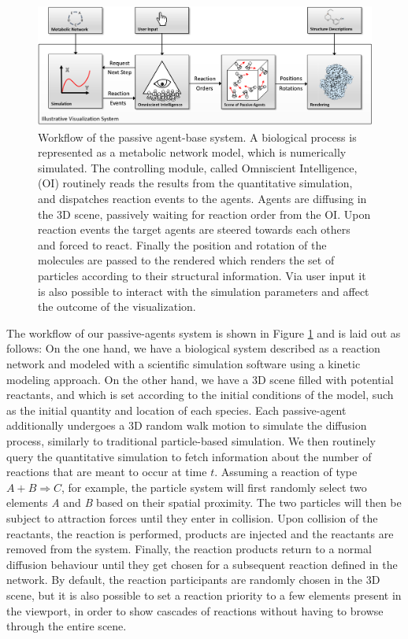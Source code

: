 \begin{figure}
	\centering
	\includegraphics[width=0.8\linewidth]{graphics/figure2_1}
	\caption{Workflow of the passive agent-base system. A biological process is represented as a metabolic network model, which is numerically simulated. The controlling module, called Omniscient Intelligence, (OI) routinely reads the results from the quantitative simulation, and dispatches reaction events to the agents. Agents are diffusing in the 3D scene, passively waiting for reaction order from the OI. Upon reaction events the target agents are steered towards each others and forced to react. Finally the position and rotation of the molecules are passed to the rendered which renders the set of particles according to their structural information. Via user input it is also possible to interact with the simulation parameters and affect the outcome of the visualization.}
	\label{fig:figure21}
\end{figure}

The workflow of our passive-agents system is shown in Figure \ref{fig:figure21} and is laid out as follows:
On the one hand, we have a biological system described as a reaction network and modeled with a scientific simulation software using a kinetic modeling approach.
On the other hand, we have a 3D scene filled with potential reactants, and which is set according to the initial conditions of the model, such as the initial quantity and location of each species.
Each passive-agent additionally undergoes a 3D random walk motion to simulate the diffusion process, similarly to traditional particle-based simulation.
We then routinely query the quantitative simulation to fetch information about the number of reactions that are meant to occur at time $t$.
Assuming a reaction of type $A + B \Rightarrow C$, for example, the particle system will first randomly select two elements \textit{A} and \textit{B} based on their spatial proximity.
The two particles will then be subject to attraction forces until they enter in collision.
Upon collision of the reactants, the reaction is performed, products are injected and the reactants are removed from the system.
Finally, the reaction products return to a normal diffusion behaviour until they get chosen for a subsequent reaction defined in the network.
By default, the reaction participants are randomly chosen in the 3D scene, but it is also possible to set a reaction priority to a few elements present in the viewport, in order to show cascades of reactions without having to browse through the entire scene.



